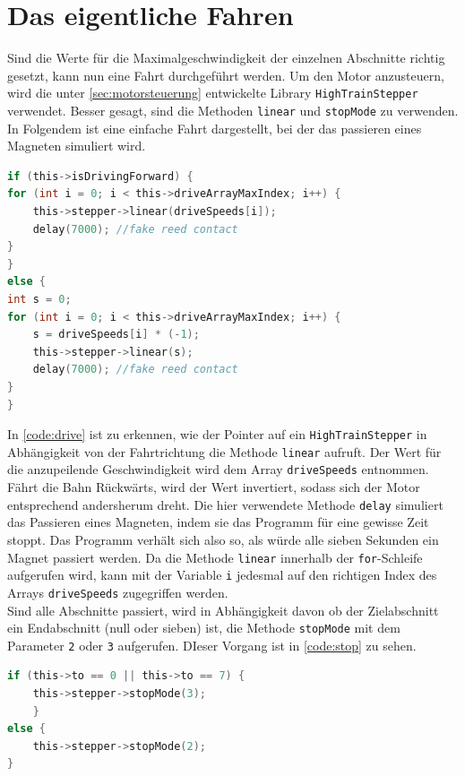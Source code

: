 \section{Das eigentliche Fahren}
Sind die Werte für die Maximalgeschwindigkeit der einzelnen Abschnitte richtig gesetzt, kann nun eine Fahrt durchgeführt werden. Um den Motor anzusteuern, wird die unter \autoref{sec:motorsteuerung} entwickelte Library \texttt{HighTrainStepper} verwendet. Besser gesagt, sind die Methoden \texttt{linear} und \texttt{stopMode} zu verwenden. In Folgendem ist eine einfache Fahrt dargestellt, bei der das passieren eines Magneten simuliert wird. 

\vspace{0.5cm}
\begin{lstlisting}[language=c, style=dhpaperdefault]
if (this->isDrivingForward) {
for (int i = 0; i < this->driveArrayMaxIndex; i++) {
	this->stepper->linear(driveSpeeds[i]);
	delay(7000); //fake reed contact
}
}
else {
int s = 0;
for (int i = 0; i < this->driveArrayMaxIndex; i++) {
	s = driveSpeeds[i] * (-1);
	this->stepper->linear(s);
	delay(7000); //fake reed contact
}
}
\end{lstlisting}
\vspace{0.5cm}

In \autoref{code:drive} ist zu erkennen, wie der Pointer auf ein \texttt{HighTrainStepper} in Abhängigkeit von der Fahrtrichtung die Methode \texttt{linear} aufruft. Der Wert für die anzupeilende Geschwindigkeit wird dem Array \texttt{driveSpeeds} entnommen. Fährt die Bahn Rückwärts, wird der Wert invertiert, sodass sich der Motor entsprechend andersherum dreht. Die hier verwendete Methode \texttt{delay} simuliert das Passieren eines Magneten, indem sie das Programm für eine gewisse Zeit stoppt. Das Programm verhält sich also so, als würde alle sieben Sekunden ein Magnet passiert werden. Da die Methode \texttt{linear} innerhalb der \texttt{for}-Schleife aufgerufen wird, kann mit der Variable \texttt{i} jedesmal auf den richtigen Index des Arrays \texttt{driveSpeeds} zugegriffen werden. \\
Sind alle Abschnitte passiert, wird in Abhängigkeit davon ob der Zielabschnitt ein Endabschnitt (null oder sieben) ist, die Methode \texttt{stopMode} mit dem Parameter \texttt{2} oder \texttt{3} aufgerufen. DIeser Vorgang ist in \autoref{code:stop} zu sehen.

\vspace{0.5cm}
\begin{lstlisting}[language=c, style=dhpaperdefault]
if (this->to == 0 || this->to == 7) {
	this->stepper->stopMode(3);
	}
else {
	this->stepper->stopMode(2);
}
\end{lstlisting}
\vspace{0.5cm}

